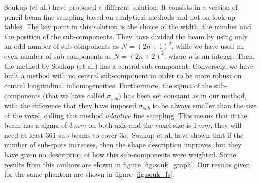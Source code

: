 \documentclass[12pt, a4paper, twoside]{book}
\begin{document}

Soukup (et al.) \cite{souk:pba} have proposed a different solution. It consists in a version of pencil beam fine sampling based on analytical methods and not on look-up tables. The key point in this solution is the choice of the width, the number and the position of the sub-components. They have divided the beam by using only an odd number of sub-components as $N=(2n+1)^2$, while we have used an even number of sub-components as $N=(2n+2)^2$, where $n$ is an integer. Then, the method by Soukup (et al.) has a central sub-component. Conversely, we have built a method with no central sub-component in order to be more robust on central longitudinal inhomogeneities. Furthermore, the sigma of the sub-components (that we have called $\sigma_{sub}$) has been set constant as in our method, with the difference that they have imposed $\sigma_{sub}$ to be always smaller than the size of the voxel, calling this method \emph{adaptive} fine sampling. This means that if the beam has a sigma of $3\,mm$ on both axis and the voxel size is $1\,mm$, they will need at least 361 sub-beams to cover $3\sigma$. Soukup et al. have shown that if the number of sub-spots increases, then the shape description improves, but they have given no description of how this sub-components were weighted.
Some results from this authors are shown in figure \ref{fig:souk_graph}. Our results given for the same phantom are shown in figure \ref{fig:souk_fs}.

\end{document}
